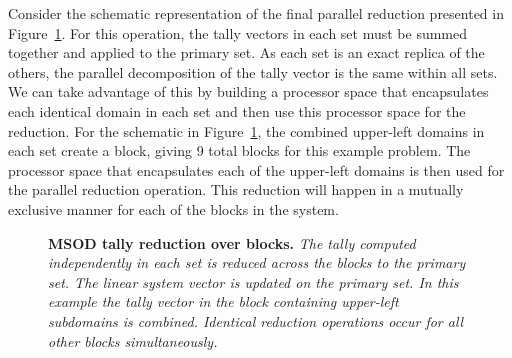 Consider the schematic representation of the final parallel reduction
presented in Figure~\ref{fig:msod_tally_reduction}. For this
operation, the tally vectors in each set must be summed together and
applied to the primary set. As each set is an exact replica of the
others, the parallel decomposition of the tally vector is the same
within all sets. We can take advantage of this by building a processor
space that encapsulates each identical domain in each set and then use
this processor space for the reduction. For the schematic in
Figure~\ref{fig:msod_tally_reduction}, the combined upper-left domains
in each set create a block, giving 9 total blocks for this example
problem. The processor space that encapsulates each of the upper-left
domains is then used for the parallel reduction operation. This
reduction will happen in a mutually exclusive manner for each of the
blocks in the system.

\begin{figure}[t!]
  \begin{center}
    \scalebox{0.55}{  }
  \end{center}
  \caption{\textbf{MSOD tally reduction over blocks.} \textit{The
      tally computed independently in each set is reduced across the
      blocks to the primary set. The linear system vector is updated
      on the primary set. In this example the tally vector in the
      block containing upper-left subdomains is combined. Identical
      reduction operations occur for all other blocks
      simultaneously.}}
  \label{fig:msod_tally_reduction}
\end{figure}

\clearpage

